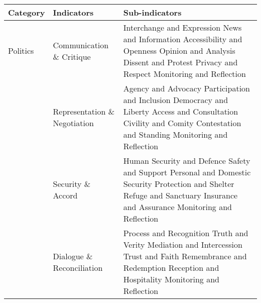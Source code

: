 \begin{table}[th]
\begin{center}
\begin{tabular}{ >{\raggedright\arraybackslash}p{} >{\raggedright\arraybackslash}p{} >{\raggedright\arraybackslash}p{} }
\hline
Category & Indicators & Sub-indicators \\
\hline
Politics & Communication \& Critique & Interchange and Expression \linebreak News and Information \linebreak Accessibility and Openness \linebreak Opinion and Analysis \linebreak Dissent and Protest \linebreak Privacy and Respect \linebreak Monitoring and Reflection \linebreak \\
  & Representation \& Negotiation & Agency and Advocacy \linebreak Participation and Inclusion \linebreak Democracy and Liberty \linebreak Access and Consultation \linebreak Civility and Comity \linebreak Contestation and Standing \linebreak Monitoring and Reflection \linebreak \\
  & Security \& Accord & Human Security and Defence \linebreak Safety and Support \linebreak Personal and Domestic Security \linebreak Protection and Shelter \linebreak Refuge and Sanctuary \linebreak Insurance and Assurance \linebreak Monitoring and Reflection \linebreak \\
  & Dialogue \& Reconciliation & Process and Recognition \linebreak Truth and Verity \linebreak Mediation and Intercession \linebreak Trust and Faith \linebreak Remembrance and Redemption \linebreak Reception and Hospitality \linebreak Monitoring and Reflection \linebreak \\

\end{tabular}
\end{center}
\end{table}
